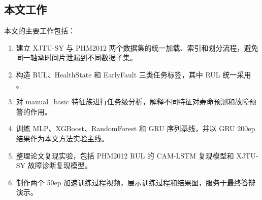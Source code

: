 \subsection{本文工作}

本文的主要工作包括：

\begin{enumerate}
  \item 建立 XJTU-SY 与 PHM2012 两个数据集的统一加载、索引和划分流程，避免同一轴承时间片泄漏到不同数据子集。
  \item 构造 RUL、HealthState 和 EarlyFault 三类任务标签，其中 RUL 统一采用 。
  \item 对 manual\_basic 特征族进行任务级分析，解释不同特征对寿命预测和故障预警的作用。
  \item 训练 MLP、XGBoost、RandomForest 和 GRU 序列基线，并以 GRU 200ep 结果作为本文方法实验主线。
  \item 整理论文复现实验，包括 PHM2012 RUL 的 CAM-LSTM 复现模型和 XJTU-SY 故障诊断复现模型。
  \item 制作两个 50ep 加速训练过程视频，展示训练过程和结果图，服务于最终答辩演示。
\end{enumerate}
